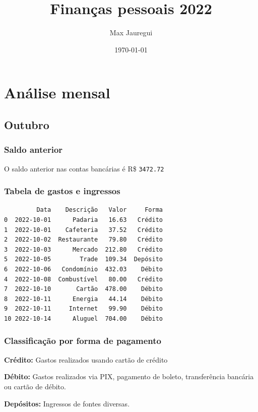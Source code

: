 \documentclass[11pt]{article}
\author{Max Jauregui}
\date{\today}
\title{Finanças pessoais 2022}
\begin{document}
\maketitle
\setcounter{tocdepth}{2}
\tableofcontents


\section{Análise mensal}
\label{sec:org42e41a2}

\subsection{Outubro}
\label{sec:org93f7bc3}

\subsubsection{Saldo anterior}
\label{sec:orgb0f3714}

O saldo anterior nas contas bancárias é R\$ \texttt{3472.72}

\subsubsection{Tabela de gastos e ingressos}
\label{sec:org230132e}

\begin{verbatim}
         Data    Descrição   Valor     Forma
0  2022-10-01      Padaria   16.63   Crédito
1  2022-10-01    Cafeteria   37.52   Crédito
2  2022-10-02  Restaurante   79.80   Crédito
3  2022-10-03      Mercado  212.80   Crédito
5  2022-10-05        Trade  109.34  Depósito
6  2022-10-06   Condomínio  432.03    Débito
4  2022-10-08  Combustível   80.00   Crédito
7  2022-10-10       Cartão  478.00    Débito
8  2022-10-11      Energia   44.14    Débito
9  2022-10-11     Internet   99.90    Débito
10 2022-10-14      Aluguel  704.00    Débito
\end{verbatim}

\subsubsection{Classificação por forma de pagamento}
\label{sec:orga40c7a8}

\textbf{Crédito:} Gastos realizados usando cartão de crédito

\textbf{Débito:} Gastos realizados via PIX, pagamento de boleto, transferência bancária ou cartão de débito.

\textbf{Depósitos:} Ingressos de fontes diversas.
\end{document}
